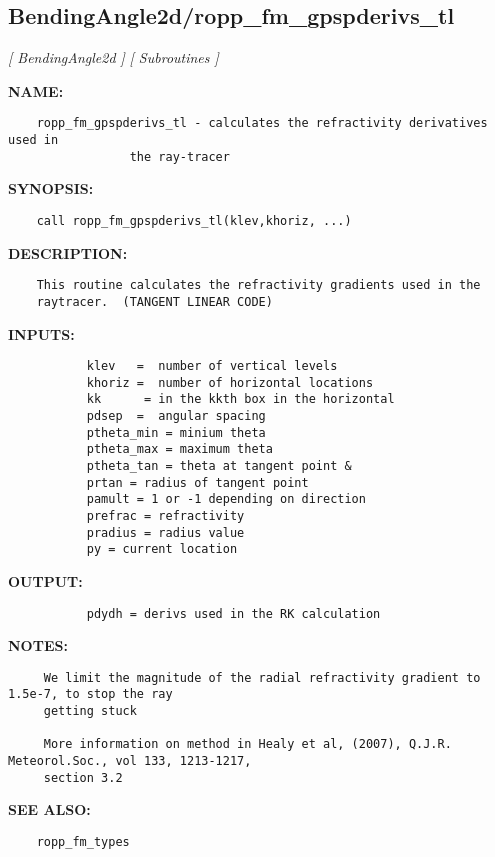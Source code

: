 \subsection{BendingAngle2d/ropp\_fm\_gpspderivs\_tl}
\textsl{[ BendingAngle2d ]}
\textsl{[ Subroutines ]}

\label{ch:robo15}
\label{ch:BendingAngle2d_ropp_fm_gpspderivs_tl}
\textbf{NAME:}\hspace{0.08in}\begin{Verbatim}
    ropp_fm_gpspderivs_tl - calculates the refractivity derivatives used in
                 the ray-tracer 
\end{Verbatim}
\textbf{SYNOPSIS:}\hspace{0.08in}\begin{Verbatim}
    call ropp_fm_gpspderivs_tl(klev,khoriz, ...)
\end{Verbatim}
\textbf{DESCRIPTION:}\hspace{0.08in}\begin{Verbatim}
    This routine calculates the refractivity gradients used in the
    raytracer.  (TANGENT LINEAR CODE)
\end{Verbatim}
\textbf{INPUTS:}\hspace{0.08in}\begin{Verbatim}
           klev   =  number of vertical levels
           khoriz =  number of horizontal locations
           kk      = in the kkth box in the horizontal
           pdsep  =  angular spacing
           ptheta_min = minium theta 
           ptheta_max = maximum theta 
           ptheta_tan = theta at tangent point & 
           prtan = radius of tangent point
           pamult = 1 or -1 depending on direction
           prefrac = refractivity
           pradius = radius value
           py = current location
\end{Verbatim}
\textbf{OUTPUT:}\hspace{0.08in}\begin{Verbatim}
           pdydh = derivs used in the RK calculation
\end{Verbatim}
\textbf{NOTES:}\hspace{0.08in}\begin{Verbatim}
     We limit the magnitude of the radial refractivity gradient to 1.5e-7, to stop the ray
     getting stuck 

     More information on method in Healy et al, (2007), Q.J.R. Meteorol.Soc., vol 133, 1213-1217, 
     section 3.2  
\end{Verbatim}
\textbf{SEE ALSO:}\hspace{0.08in}\begin{Verbatim}
    ropp_fm_types
\end{Verbatim}
